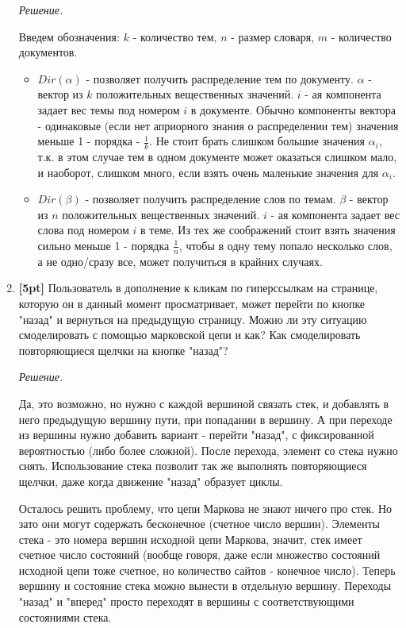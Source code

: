 \begin{enumerate}
	\textit{Решение.}
	
	Введем обозначения: $k$ - количество тем, $n$ - размер словаря, $m$ - количество документов.
	
	\begin{itemize}
		\item $Dir(\alpha)$ - позволяет получить распределение тем по документу. $\alpha$ - вектор 
		из $k$ положительных вещественных значений. $i$ - ая компонента задает вес темы под 
		номером $i$ в документе. Обычно компоненты вектора - одинаковые (если нет априорного 
		знания о распределении тем) значения меньше 1 - порядка - $\frac{1}{k}$. Не стоит брать 
		слишком большие значения $\alpha_i$, т.к. в этом случае тем в одном документе может 
		оказаться слишком мало, и наоборот, слишком много, если взять очень маленькие значения для 
		$\alpha_i$. 
		
		\item $Dir(\beta)$ - позволяет получить распределение слов по темам. $\beta$ - вектор из 
		$n$ положительных вещественных значений. $i$ - ая компонента задает вес слова под номером 
		$i$ в теме. Из тех же соображений стоит взять значения сильно меньше 1 - порядка 
		$\frac{1}{n}$, чтобы в одну тему попало несколько слов, а не одно/сразу все, может 
		получиться в крайних случаях.
	\end{itemize}
	
	\item \textbf{[5pt]} Пользователь в дополнение к кликам по гиперссылкам на странице, которую 
	он в данный момент просматривает, может перейти по кнопке "назад" и вернуться на предыдущую 
	страницу. Можно ли эту ситуацию смоделировать с помощью марковской цепи и как? Как 
	смоделировать повторяющиеся щелчки на кнопке "назад"?
	
	\textit{Решение.}
	
	Да, это возможно, но нужно с каждой вершиной связать стек, и добавлять в него предыдущую 
	вершину пути, при попадании в вершину. А при переходе из вершины нужно добавить вариант - 
	перейти "назад", с фиксированной вероятностью (либо более сложной). После перехода, элемент со 
	стека нужно снять. Использование стека позволит так же выполнять повторяющиеся щелчки, даже 
	когда движение "назад" образует циклы. 
	
	Осталось решить проблему, что цепи Маркова не знают ничего про стек. Но зато они могут 
	содержать бесконечное (счетное число вершин). Элементы стека - это номера вершин исходной цепи 
	Маркова, значит, стек имеет счетное число состояний (вообще говоря, даже если множество 
	состояний исходной цепи тоже счетное, но количество сайтов - конечное число). Теперь вершину и 
	состояние стека можно вынести в отдельную вершину. Переходы "назад" и "вперед" просто переходят 
	в вершины с соответствующими состояниями стека.


\end{enumerate}
